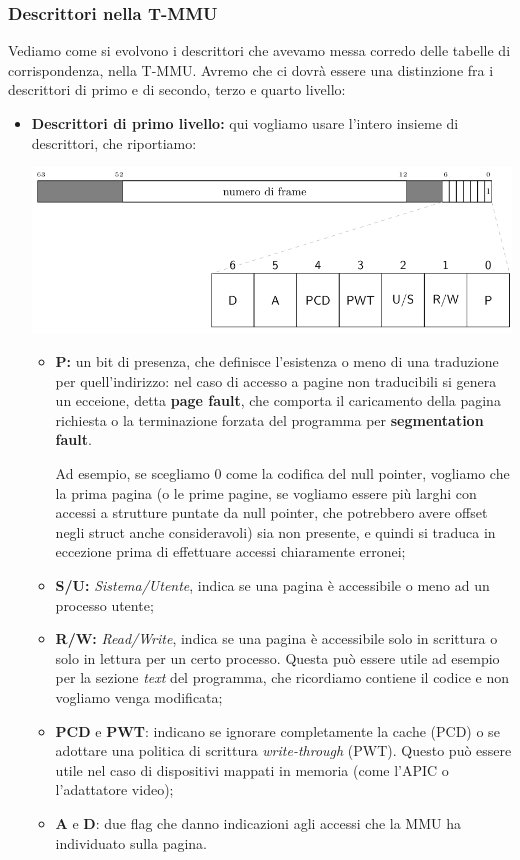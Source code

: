 \documentclass[a4paper,11pt]{article}
\begin{document}
\subsubsection{Descrittori nella T-MMU}
Vediamo come si evolvono i descrittori che avevamo messa corredo delle tabelle di corrispondenza, nella T-MMU.
Avremo che ci dovrà essere una distinzione fra i descrittori di primo e di secondo, terzo e quarto livello:
\begin{itemize}
	\item \textbf{Descrittori di primo livello:}
		qui vogliamo usare l'intero insieme di descrittori, che riportiamo:
\begin{center}
	\includegraphics[scale=0.6]{../figures/mmu_level1.png}
\end{center}
\begin{itemize}
	\item \textbf{P:} un bit di presenza, che definisce l'esistenza o meno di una traduzione per quell'indirizzo: nel caso di accesso a pagine non traducibili si genera un ecceione, detta \textbf{page fault}, che comporta il caricamento della pagina richiesta o la terminazione forzata del programma per \textbf{segmentation fault}.

		Ad esempio, se scegliamo 0 come la codifica del null pointer, vogliamo che la prima pagina (o le prime pagine, se vogliamo essere più larghi con accessi a strutture puntate da null pointer, che potrebbero avere offset negli struct anche consideravoli) sia non presente, e quindi si traduca in eccezione prima di effettuare accessi chiaramente erronei;
	\item \textbf{S/U:} \textit{Sistema/Utente}, indica se una pagina è accessibile o meno ad un processo utente;  
	\item \textbf{R/W:} \textit{Read/Write}, indica se una pagina è accessibile solo in scrittura o solo in lettura per un certo processo. 
		Questa può essere utile ad esempio per la sezione \textit{text} del programma, che ricordiamo contiene il codice e non vogliamo venga modificata;
	\item \textbf{PCD} e \textbf{PWT}: indicano se ignorare completamente la cache (PCD) o se adottare una politica di scrittura \textit{write-through} (PWT).
		Questo può essere utile nel caso di dispositivi mappati in memoria (come l'APIC o l'adattatore video);
	\item \textbf{A} e \textbf{D}: due flag che danno indicazioni agli accessi che la MMU ha individuato sulla pagina.


\end{itemize}
\end{itemize}
\end{document}
